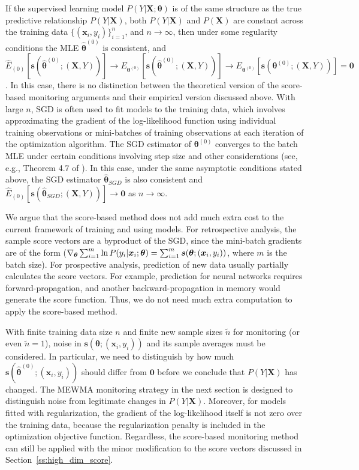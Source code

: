 \documentclass[twoside,11pt]{article}
\begin{document}
If the supervised learning model $P(Y|\bm{X};\bm{\theta})$ is of the same structure as the true predictive relationship $P(Y|\bm{X})$, both $P(Y|\bm{X})$ and $P(\bm{X})$ are constant across the training data $\{(\bm{x}_i, y_i)\}_{i=1}^n$, and $n \to \infty$, then under some regularity conditions the MLE $\hat{\bm { \theta}} ^{ (0)}$ is consistent, and  $\hat{E}_{(0)} [\bm{s}(\hat{\bm { \theta}} ^{ (0)};(\bm {X}, Y))] \to E_{\bm { \theta} ^{ (0)}}[\bm{s}(\hat{\bm { \theta}} ^{ (0)};(\bm {X}, Y))] \to E_{\bm { \theta} ^{ (0)}}[\bm{s}(\bm { \theta} ^{ (0)};(\bm {X}, Y))] = \bm {0}$. In this case, there is no distinction between the theoretical version of the score-based monitoring arguments and their empirical version discussed above. With large $n$, SGD is often used to fit models to the training data, which involves approximating the gradient of the log-likelihood function using individual training observations or mini-batches of training observations at each iteration of the optimization algorithm. The SGD estimator of $\bm { \theta} ^{ (0)}$ converges to the batch MLE under certain conditions involving step size and other considerations (see, e.g., Theorem 4.7 of \cite{bottou2018optimization}). In this case, under the same asymptotic conditions stated above, the SGD estimator $\hat {\bm { \theta}}_{SGD}$ is also consistent and $\hat{E}_{(0)} [\bm{s}(\hat{\bm { \theta}}_{SGD};(\bm {X}, Y))] \to \bm{0}$ as $n \to \infty$. 

We argue that the score-based method does not add much extra cost to the current framework of training and using models. For retrospective analysis, the sample score vectors are a byproduct of the SGD, since the mini-batch gradients are of the form ($\\ \nabla _{\bm { \theta}} \sum _{i=1} ^{m} \ln P(y_i|\bm {x}_i;\bm{\theta}) = \sum _{i=1} ^{m} \bm{s}(\bm { \theta};(\bm {x}_i, y_i))$, where $m$ is the batch size). For prospective analysis, prediction of new data usually partially calculates the score vectors. For example, prediction for neural networks requires forward-propagation, and another backward-propagation in memory would generate the score function. Thus, we do not need much extra computation to apply the score-based method.

With finite training data size $n$ and finite new sample sizes $\tilde{n}$ for monitoring (or even $\tilde{n}=1$), noise in $\bm{s}(\bm { \theta};(\bm {x}_i, y_i))$ and its sample averages must be considered. In particular, we need to distinguish by how much $\bm{s}(\hat{\bm { \theta}}^{(0)};(\bm {x}_i, y_i))$ should differ from $\bm{0}$ before we conclude that $P(Y|\bm{X})$ has changed. The MEWMA monitoring strategy in the next section is designed to distinguish noise from legitimate changes in $P(Y|\bm{X})$. Moreover, for models fitted with regularization, the gradient of the log-likelihood itself is not zero over the training data, because the regularization penalty is included in the optimization objective function. Regardless, the score-based monitoring method can still be applied with the minor modification to the score vectors discussed in Section~\ref{ss:high_dim_score}.
\end{document}
